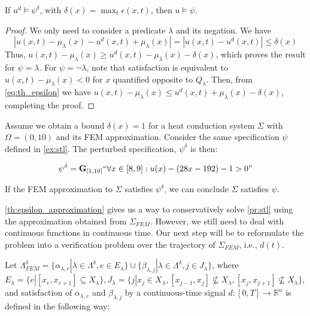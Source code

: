 \documentclass[oribibl]{llncs/llncs}
\newcommand*{\R}{\mathbb{R}}
\newcommand{\Always}{\mathbf{G}}
\begin{document}
\begin{theorem}
\label{th:epsilon_approximation}
    If $u^d \models \psi^{\delta}$, with $\delta(x) = \max_t \epsilon(x, t)$, then $u \models \psi$.
\end{theorem}
\begin{proof}
    We only need to consider a predicate $\lambda$ and its negation. We have
    \begin{equation}
        \label{eq:th_epsilon}
         |u(x, t) - \mu_\lambda(x) - u^d(x, t) + \mu_\lambda(x)| = 
         |u(x, t) - u^d(x, t)| \leq \delta(x)
    \end{equation}
    Thus, $u(x, t) - \mu_\lambda(x) \geq u^d(x, t) -
    \mu_\lambda(x) - \delta(x)$, which proves the result for $\psi = \lambda$. For $\psi
    = \lnot \lambda$, note that satisfaction is equivalent to $u(x, t) -
    \mu_\lambda(x) < 0$ for $x$ quantified opposite to $Q_\lambda$. Then, from
    \cref{eq:th_epsilon} we have $u(x, t) - \mu_\lambda(x) \leq u^d(x, t) +
    \mu_\lambda(x) - \delta(x)$, completing the proof.
\end{proof}

\begin{example}
    \label{ex:eps_approx}

    Assume we obtain a bound $\delta(x) = 1$ for a heat conduction system $\Sigma$ with
    $\Omega = (0, 10)$ and its
    FEM approximation. Consider the same specification $\psi$ defined in \cref{ex:stl}.
    The perturbed specification, $\psi^\delta$ is then:
    
    \begin{equation}
        \psi^\delta = \Always_{[1,10]} ``\forall x \in [8,9] : u(x) - (28x -
        192) - 1 > 0"
    \end{equation}

    If the FEM approximation to $\Sigma$ satisfies $\psi^\delta$, we can
    conclude $\Sigma$ satisfies $\psi$.
    
\end{example}

\cref{th:epsilon_approximation} gives us a way to conservatively solve
\cref{pr:stl} using the approximation obtained from $\Sigma_{FEM}$.
However, we still need to deal with continuous functions in continuous time. Our
next step will be to reformulate the problem into a verification problem over
the trajectory of $\Sigma_{FEM}$, i.e., $d(t)$.

Let $\Lambda^{\delta}_{FEM} = \{\alpha_{\lambda, e} | \lambda \in
\Lambda^{\delta}, e \in E_{\lambda}\} \cup \{\beta_{\lambda, j} | \lambda \in
\Lambda^{\delta}, j \in J_{\lambda}\}$, where $E_{\lambda} = \{e | [x_e, x_{e+1}] \subseteq
X_{\lambda}\}, J_{\lambda} = \{j | x_j \in X_\lambda, [x_{j-1}, x_j] \not\subseteq
X_\lambda, [x_{j}, x_{j+1}] \not\subseteq X_\lambda \}$,
and satisfaction of $\alpha_{\lambda, e}$ and $\beta_{\lambda, j}$ by 
a continuous-time signal $d : [0, T] \to \R^n$
is defined in the following way:
\end{document}
